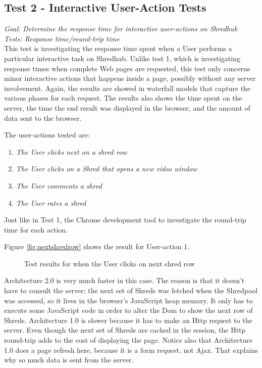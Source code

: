 \subsection{Test 2 - Interactive User-Action Tests}
\textit{Goal: Determine the response time for interactive user-actions on Shredhub} \\
\textit{Tests: Response time/round-trip time}\\
This test is investigating the response time spent when a User performs a particular interactive task on Shredhub. Unlike test 1, which is investigating response times when complete Web pages are requested, this test only concerns minor interactive actions that happens inside a page, possibly without any server involvement. Again, the results are showed in waterfall models that capture the various phases for each request. The results also shows the time spent on the server, the time the end result was displayed in the browser, and the amount of data sent to the browser.

The user-actions tested are:
\begin{enumerate}
\item \textit{The User clicks next on a shred row}
\item \textit{The User clicks on a Shred that opens a new video window}
\item \textit{The User comments a shred}
\item \textit{The User rates a shred}
\end{enumerate}
Just like in Test 1, the Chrome development tool to investigate the round-trip time for each action. 

Figure \vref{fig:nextshredrow} shows the result for User-action 1. 
\begin{figure}
\begin{center}
\end{center}
\caption{Test results for when the User clicks on next shred row}\label{fig:nextshredrow}
\end{figure}
Architecture 2.0 is very much faster in this case. The reason is that it doesn't have to consult the server; the next set of Shreds was fetched when the Shredpool was accessed, so it lives in the browser's JavaScript heap memory. It only has to execute some JavaScript code in order to alter the Dom to show the next row of Shreds. Architecture 1.0 is slower because it has to make an Http request to the server. Even though the next set of Shreds are cached in the session, the Http round-trip adds to the cost of displaying the page. Notice also that Architecture 1.0 does a page refresh here, because it is a form request, not Ajax. That explains why so much data is sent from the server. 

